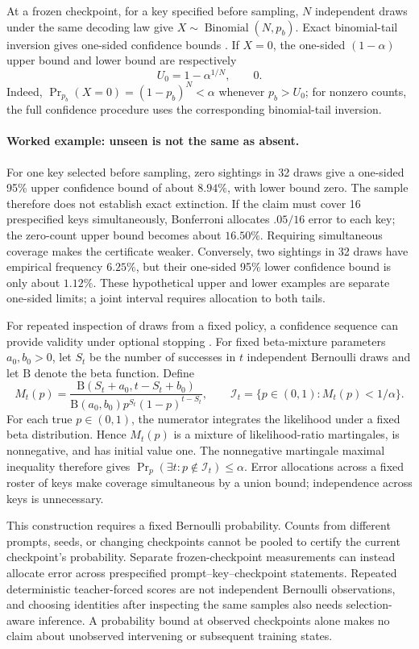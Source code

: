 At a frozen checkpoint, for a key specified before sampling, $N$ independent
draws under the same decoding law give
$X\sim\operatorname{Binomial}(N,p_b)$. Exact binomial-tail inversion gives
one-sided confidence bounds \citep{clopper1934binomial}. If $X=0$, the
one-sided $(1-\alpha)$ upper bound and lower bound are respectively
\[
 U_0=1-\alpha^{1/N},\qquad 0.
\]
Indeed, $\Pr_{p_b}(X=0)=(1-p_b)^N<\alpha$ whenever $p_b>U_0$; for nonzero
counts, the full confidence procedure uses the corresponding binomial-tail
inversion.

\paragraph{Worked example: unseen is not the same as absent.}
For one key selected before sampling, zero sightings in 32 draws give a
one-sided 95\% upper confidence bound of about $8.94\%$, with lower bound
zero. The sample therefore does not establish exact extinction.
If the claim must cover 16 prespecified keys simultaneously, Bonferroni
allocates $.05/16$ error to each key; the zero-count upper bound becomes
about $16.50\%$. Requiring simultaneous coverage makes the certificate weaker.
Conversely, two sightings in 32 draws have empirical frequency $6.25\%$,
but their one-sided 95\% lower confidence bound is only about $1.12\%$.
These hypothetical upper and lower examples are separate one-sided limits;
a joint interval requires allocation to both tails.

For repeated inspection of draws from a fixed policy, a confidence sequence
can provide validity under optional stopping \citep{howard2021confidence}.
For fixed beta-mixture parameters $a_0,b_0>0$, let $S_t$ be the number of
successes in $t$ independent Bernoulli draws and let $\mathrm B$ denote
the beta function. Define
\[
 M_t(p)=\frac{\mathrm B(S_t+a_0,t-S_t+b_0)}
 {\mathrm B(a_0,b_0)p^{S_t}(1-p)^{t-S_t}},\qquad
 \mathcal I_t=\{p\in(0,1):M_t(p)<1/\alpha\}.
\]
For each true $p\in(0,1)$, the numerator integrates the likelihood under a
fixed beta distribution. Hence $M_t(p)$ is a mixture of likelihood-ratio
martingales, is nonnegative, and has initial value one. The nonnegative
martingale maximal inequality therefore gives
$\Pr_p(\exists t:p\notin\mathcal I_t)\le\alpha$. Error allocations across
a fixed roster of keys make coverage simultaneous by a union bound;
independence across keys is unnecessary.

This construction requires a fixed Bernoulli probability. Counts from
different prompts, seeds, or changing checkpoints cannot be pooled to
certify the current checkpoint's probability. Separate frozen-checkpoint
measurements can instead allocate error across prespecified
prompt--key--checkpoint statements. Repeated deterministic teacher-forced
scores are not independent Bernoulli observations, and choosing identities
after inspecting the same samples also needs selection-aware inference.
A probability bound at observed checkpoints alone makes no claim about
unobserved intervening or subsequent training states.

